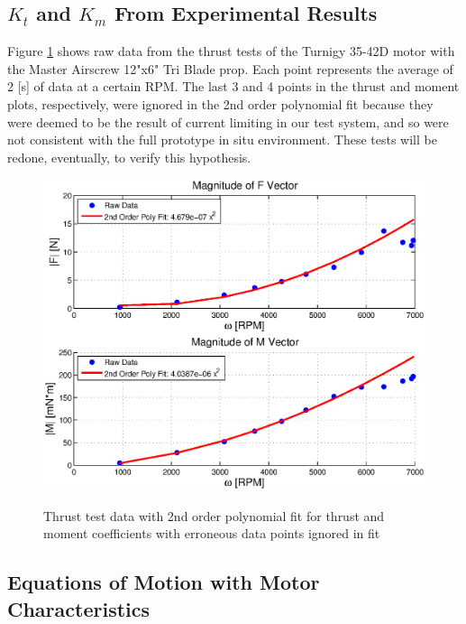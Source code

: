 \documentclass{article}
\numberwithin{equation}{section}
\begin{document}
\subsection{$K_t$ and $K_m$ From Experimental Results}
Figure \ref{thrustAndMomCoeffs} shows raw data from the thrust tests of the Turnigy 35-42D motor with the Master Airscrew 12"x6" Tri Blade prop.  Each point represents the average of 2 [s] of data at a certain RPM.  The last 3 and 4 points in the thrust and moment plots, respectively, were ignored in the 2nd order polynomial fit because they were deemed to be the result of current limiting in our test system, and so were not consistent with the full prototype in situ environment.  These tests will be redone, eventually, to verify this hypothesis. 
\begin{figure}[h]
  \includegraphics[width=5in]{images/forceAndMomMagFitOmega.eps}
     \label{thrustAndMomCoeffs}
  \caption{Thrust test data with 2nd order polynomial fit for thrust and moment coefficients with erroneous data points ignored in fit}
\end{figure}

\subsection{Equations of Motion with Motor Characteristics}
\end{document}
